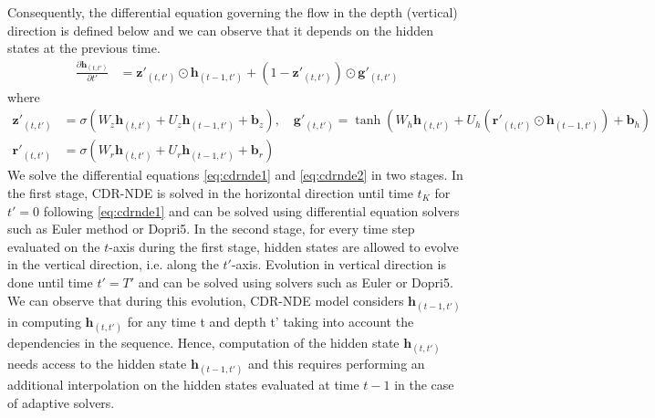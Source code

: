 \documentclass{article} %
\newcommand{\bz}{\mathbf{z}}
\newcommand{\bg}{\mathbf{g}}
\newcommand{\bh}{\mathbf{h}}
\newcommand{\bb}{\mathbf{b}}
\newcommand{\br}{\mathbf{r}}
\begin{document}
Consequently, the  differential equation governing the flow in the depth (vertical) direction is defined below and we can observe that it depends on the  hidden states at the previous time.
\begin{equation}
    \begin{aligned}
   \frac{\partial \bh_{(t,t')}}{\partial t'} &= \bz'_{(t,t')} \odot \bh_{(t-1,t')}  + (1-\bz'_{(t,t')})\odot\bg'_{(t,t')} 
    \end{aligned}
    \label{eq:cdrnde2}
\end{equation}
where
\begin{equation}
    \begin{aligned}
    \bz'_{(t,t')} &= \sigma(W_z\bh_{(t,t')} + U_z\bh_{(t-1,t')} + \bb_z)\nonumber, \quad 
    \bg'_{(t,t')} = \tanh(W_h\bh_{(t,t')} + U_h(\br'_{(t,t')} \odot \bh_{(t-1,t')}) + \bb_h) \\
        \br'_{(t,t')} &= \sigma(W_r\bh_{(t,t')} + U_r\bh_{(t-1,t')} + \bb_r) \nonumber  
    \end{aligned}
\end{equation}
We solve the differential equations \eqref{eq:cdrnde1} and \eqref{eq:cdrnde2} in two stages.  In the first stage, CDR-NDE is solved in the horizontal direction until time $t_K$ for $t'=0$ following \eqref{eq:cdrnde1} and can be solved using differential equation solvers such as Euler method or Dopri5. 
In the second stage, for every  time step evaluated  on the $t$-axis during the first stage, hidden states are allowed to evolve in the vertical direction, i.e.  along the $t'$-axis.  Evolution in vertical direction is done until time $t'= T'$ and can be solved  using  solvers such as Euler or Dopri5. We can observe that during this evolution, CDR-NDE model considers  $\bh_{(t-1,t')}$ in computing $\bh_{(t,t')} $ for any time t and depth t' taking into account the dependencies in the sequence. Hence, computation of the hidden state $\bh_{(t,t')}$ needs access to the hidden state  $\bh_{(t-1,t')}$  and this requires performing an additional interpolation on the hidden states evaluated at time $t-1$ in the case of adaptive solvers. 
\end{document}
